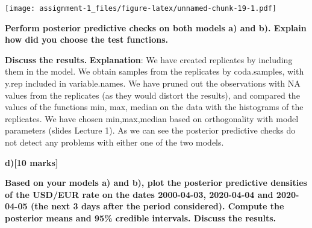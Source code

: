 \documentclass[
]{article}
\begin{document}
\texttt{[image: assignment-1\_files/figure-latex/unnamed-chunk-19-1.pdf]}

\textbf{Perform posterior predictive checks on both models a) and b).
Explain how did you choose the test functions.}

\textbf{Discuss the results.} \textbf{Explanation}: We have created
replicates by including them in the model. We obtain samples from the
replicates by coda.samples, with y.rep included in variable.names. We
have pruned out the observations with NA values from the replicates (as
they would distort the results), and compared the values of the
functions min, max, median on the data with the histograms of the
replicates. We have chosen min,max,median based on orthogonality with
model parameters (slides Lecture 1). As we can see the posterior
predictive checks do not detect any problems with either one of the two
models.

\textbf{d){[}10 marks{]}}

\textbf{Based on your models a) and b), plot the posterior predictive
densities of the USD/EUR rate on the dates 2000-04-03, 2020-04-04 and
2020-04-05 (the next 3 days after the period considered). Compute the
posterior means and 95\% credible intervals. Discuss the results.}
\end{document}
